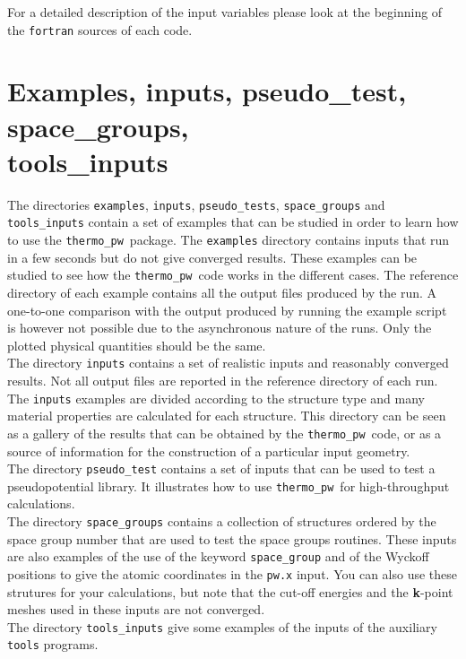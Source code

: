 \documentclass[12pt,a4paper]{article}
\def\thermo{\texttt{thermo\_pw}}
\begin{document}
For a detailed description of the input variables please look at the beginning 
of the \texttt{fortran} sources of each code.

\newpage
\section{\color{coral}Examples, inputs, pseudo\_test, space\_groups, \\
tools\_inputs}

The directories \texttt{examples}, \texttt{inputs}, \texttt{pseudo\_tests}, 
\texttt{space\_groups} and \texttt{tools\_inputs} contain a set
of examples that can be studied in order to learn how to use the \thermo\ 
package. The \texttt{examples} directory contains inputs that run in a few
seconds but do not give converged results. These examples can be studied 
to see how the \thermo\ code works in the different cases. The
reference directory of each example contains all the output
files produced by the run. A one-to-one comparison with the output
produced by running the example script is however not possible due to the
asynchronous nature of the runs. Only the plotted physical quantities 
should be the same. \\
The directory \texttt{inputs} contains a set
of realistic inputs and reasonably converged results. Not all
output files are reported in the reference directory of each run.
The \texttt{inputs} examples are divided according to the structure type
and many material properties are calculated for each structure.
This directory can be seen as a gallery of the results that can be
obtained by the \thermo\ code, or as a source of information for the
construction of a particular input geometry. \\
The directory \texttt{pseudo\_test} contains a set of inputs that can
be used to test a pseudopotential library. It illustrates how to use \thermo\ 
for high-throughput calculations. \\
The directory \texttt{space\_groups} contains a collection of structures
ordered by the space group number that are used to test the space
groups routines. These inputs are also examples of the use of the
keyword \texttt{space\_group} and of the Wyckoff positions to give the
atomic coordinates in the \texttt{pw.x} input. You can also use these
strutures for your calculations, but note that the cut-off energies and
the {\bf k}-point meshes used in these inputs are not converged. \\
The directory \texttt{tools\_inputs} give some examples of the inputs of
the auxiliary \texttt{tools} programs.
\end{document}

